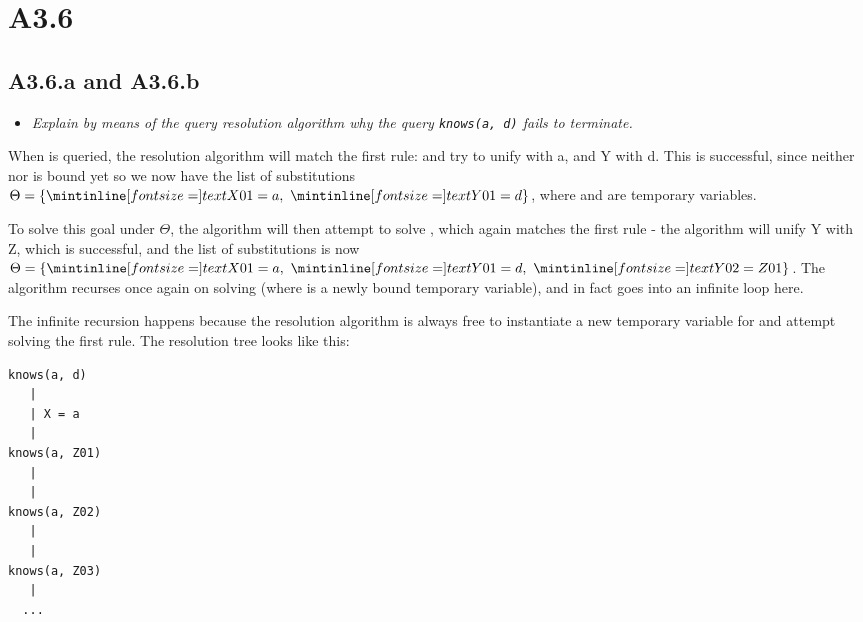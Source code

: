
\newpage
\section{A3.6}

%
%


\subsection{A3.6.a and A3.6.b}

\begin{itemize}
  \item \emph{Explain by means of the query resolution algorithm why the query
    \emph{\texttt{knows(a, d)}} fails to terminate.}
\end{itemize}

When  is queried, the resolution algorithm will match the first
 rule: and try to unify  with \ms a, and \ms Y with \ms d.
This is successful, since neither  nor  is bound yet so we now have
the list of substitutions $\Theta = \{\ms{X01 = a},\ \ms{Y01 = d}\}$, where
 and  are temporary variables.

\medskip

To solve this goal under $\Theta$, the algorithm will then attempt to solve
, which again matches the first  rule - the
algorithm will unify \ms Y with \ms Z, which is successful, and the list of
substitutions is now $\Theta = \{\ms{X01 = a},\ \ms{Y01 = d},\ \ms{Y02 =
Z01}\}$. The algorithm recurses once again on solving  (where
 is a newly bound temporary variable), and in fact goes into an infinite
loop here.

\medskip

The infinite recursion happens because the resolution algorithm is always free
to instantiate a new temporary variable for  and attempt solving the first
 rule. The resolution tree looks like this:

\begin{verbatim}
knows(a, d)
   |
   | X = a
   |
knows(a, Z01)
   |
   |
knows(a, Z02)
   |
   |
knows(a, Z03)
   |
  ...
\end{verbatim}

